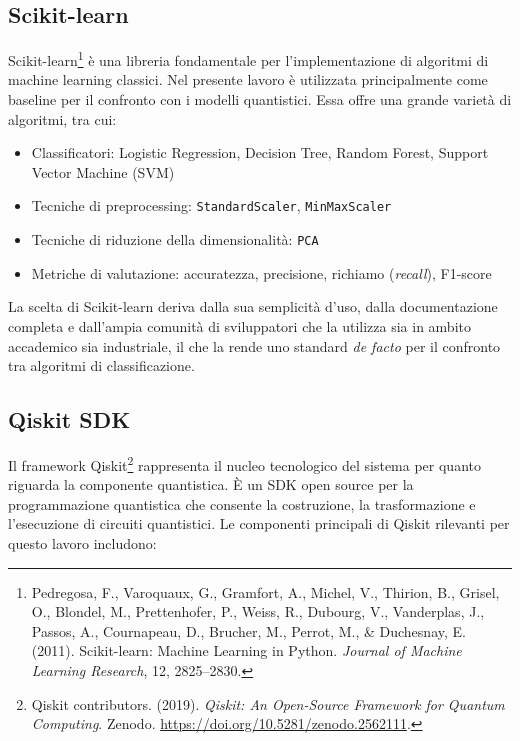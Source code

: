 \subsection{Scikit-learn}
Scikit-learn\footnote{Pedregosa, F., Varoquaux, G., Gramfort, A., Michel, V., Thirion, B., Grisel, O., Blondel, M., Prettenhofer, P., Weiss, R., Dubourg, V., Vanderplas, J., Passos, A., Cournapeau, D., Brucher, M., Perrot, M., \& Duchesnay, E. (2011). Scikit-learn: Machine Learning in Python. \textit{Journal of Machine Learning Research}, 12, 2825--2830.} è una libreria fondamentale per l'implementazione di algoritmi di machine learning classici. Nel presente lavoro è utilizzata principalmente come baseline per il confronto con i modelli quantistici. Essa offre una grande varietà di algoritmi, tra cui:
\begin{itemize}
    \item Classificatori: Logistic Regression, Decision Tree, Random Forest, Support Vector Machine (SVM)
    \item Tecniche di preprocessing: \texttt{StandardScaler}, \texttt{MinMaxScaler}
    \item Tecniche di riduzione della dimensionalità: \texttt{PCA}
    \item Metriche di valutazione: accuratezza, precisione, richiamo (\textit{recall}), F1-score
\end{itemize}

La scelta di Scikit-learn deriva dalla sua semplicità d'uso, dalla documentazione completa e dall'ampia comunità di sviluppatori che la utilizza sia in ambito accademico sia industriale, il che la rende uno standard \textit{de facto} per il confronto tra algoritmi di classificazione.

\subsection{Qiskit SDK}
Il framework Qiskit\footnote{Qiskit contributors. (2019). \textit{Qiskit: An Open-Source Framework for Quantum Computing}. Zenodo. \url{https://doi.org/10.5281/zenodo.2562111}.} rappresenta il nucleo tecnologico del sistema per quanto riguarda la componente quantistica. È un SDK open source per la programmazione quantistica che consente la costruzione, la trasformazione e l'esecuzione di circuiti quantistici. Le componenti principali di Qiskit rilevanti per questo lavoro includono:

